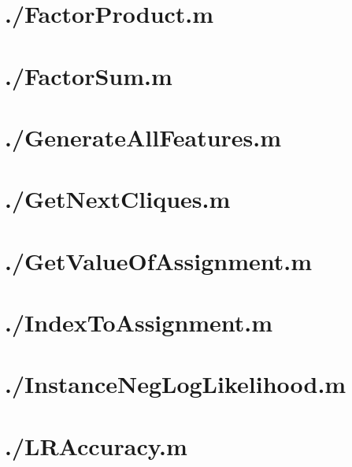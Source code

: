 \documentclass{article}
\begin{document}
\section{./FactorProduct.m}

\section{./FactorSum.m}

\section{./GenerateAllFeatures.m}

\section{./GetNextCliques.m}

\section{./GetValueOfAssignment.m}

\section{./IndexToAssignment.m}

\section{./InstanceNegLogLikelihood.m}

\section{./LRAccuracy.m}

\end{document}
